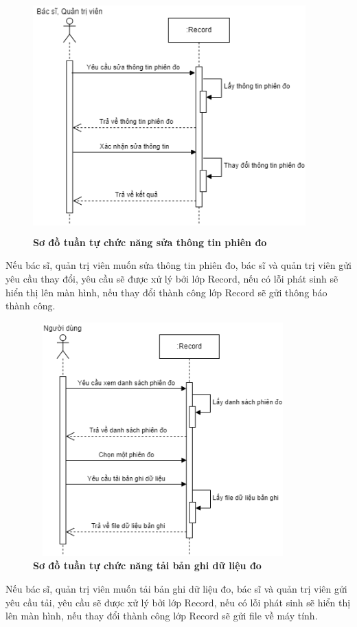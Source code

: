 \begin{figure}[H]
  \centering
  \includegraphics[width=10.5cm,height=9cm]{Images/sequence/sequence_manage_edit_record.png}
  \caption[Sơ đồ tuần tự chức năng sửa thông tin phiên đo]{\bfseries \fontsize{12pt}{0pt}
  \selectfont Sơ đồ tuần tự chức năng sửa thông tin phiên đo}
  \label{sequence_edit_record} %
\end{figure}
Nếu bác sĩ, quản trị viên muốn sửa thông tin phiên đo, bác sĩ và quản trị viên gửi yêu cầu thay đổi, yêu cầu sẽ được xử lý bởi lớp Record, 
nếu có lỗi phát sinh sẽ hiển thị lên màn hình, nếu thay đổi thành công lớp Record sẽ gửi thông báo thành công. 

\begin{figure}[H]
  \centering
  \includegraphics[width=10cm,height=9cm]{Images/sequence/sequence_download_records.png}
  \caption[Sơ đồ tuần tự chức năng tải bản ghi dữ liệu đo]{\bfseries \fontsize{12pt}{0pt}
  \selectfont Sơ đồ tuần tự chức năng tải bản ghi dữ liệu đo}
  \label{sequence_download_record} %
\end{figure}
Nếu bác sĩ, quản trị viên muốn tải bản ghi dữ liệu đo, bác sĩ và quản trị viên gửi yêu cầu tải, yêu cầu sẽ được xử lý bởi lớp Record, 
nếu có lỗi phát sinh sẽ hiển thị lên màn hình, nếu thay đổi thành công lớp Record sẽ gửi file về máy tính. 
